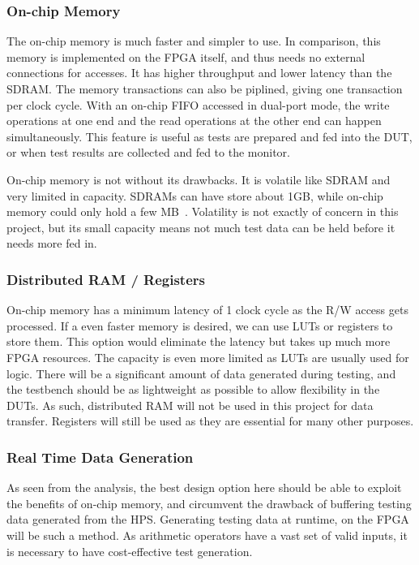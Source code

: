 \subsubsection{On-chip Memory}
The on-chip memory is much faster and simpler to use.
In comparison, this memory is implemented on the FPGA itself, and thus needs no external connections for accesses.
It has higher throughput and lower latency than the SDRAM.
The memory transactions can also be piplined, giving one transaction per clock cycle.
With an on-chip FIFO accessed in dual-port mode, the write operations at one end and the read operations at the other end can happen simultaneously.
This feature is useful as tests are prepared and fed into the DUT, or when test results are collected and fed to the monitor.

On-chip memory is not without its drawbacks.
It is volatile like SDRAM and very limited in capacity.
SDRAMs can have store about 1GB, while on-chip memory could only hold a few MB~\cite{Altera2}.
Volatility is not exactly of concern in this project, but its small capacity means not much test data can be held before it needs more fed in.

\subsubsection{Distributed RAM / Registers}
On-chip memory has a minimum latency of 1 clock cycle as the R/W access gets processed.
If a even faster memory is desired, we can use LUTs or registers to store them.
This option would eliminate the latency but takes up much more FPGA resources.
The capacity is even more limited as LUTs are usually used for logic.
There will be a significant amount of data generated during testing, and the testbench should be as lightweight as possible to allow flexibility in the DUTs.
As such, distributed RAM will not be used in this project for data transfer.
Registers will still be used as they are essential for many other purposes.

\subsubsection{Real Time Data Generation}
As seen from the analysis, the best design option here should be able to exploit the benefits of on-chip memory, and circumvent the drawback of buffering testing data generated from the HPS.
Generating testing data at runtime, on the FPGA will be such a method.
As arithmetic operators have a vast set of valid inputs, it is necessary to have cost-effective test generation.

